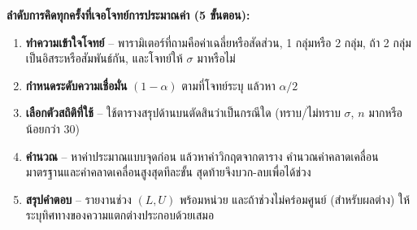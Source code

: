 \documentclass[10pt]{extarticle}
\begin{document}
\begin{formulabox}
\textbf{ลำดับการคิดทุกครั้งที่เจอโจทย์การประมาณค่า (5 ขั้นตอน):}
\begin{enumerate}
\item \textbf{ทำความเข้าใจโจทย์} -- พารามิเตอร์ที่ถามคือค่าเฉลี่ยหรือสัดส่วน, 1 กลุ่มหรือ 2 กลุ่ม, ถ้า 2 กลุ่มเป็นอิสระหรือสัมพันธ์กัน, และโจทย์ให้ $\sigma$ มาหรือไม่
\item \textbf{กำหนดระดับความเชื่อมั่น} $(1-\alpha)$ ตามที่โจทย์ระบุ แล้วหา $\alpha/2$
\item \textbf{เลือกตัวสถิติที่ใช้} -- ใช้ตารางสรุปด้านบนตัดสินว่าเป็นกรณีใด (ทราบ/ไม่ทราบ $\sigma$, $n$ มากหรือน้อยกว่า 30)
\item \textbf{คำนวณ} -- หาค่าประมาณแบบจุดก่อน แล้วหาค่าวิกฤตจากตาราง คำนวณค่าคลาดเคลื่อนมาตรฐานและค่าคลาดเคลื่อนสูงสุดทีละขั้น สุดท้ายจึงบวก-ลบเพื่อได้ช่วง
\item \textbf{สรุปคำตอบ} -- รายงานช่วง $(L,U)$ พร้อมหน่วย และถ้าช่วงไม่คร่อมศูนย์ (สำหรับผลต่าง) ให้ระบุทิศทางของความแตกต่างประกอบด้วยเสมอ
\end{enumerate}
\end{formulabox}
\end{document}

